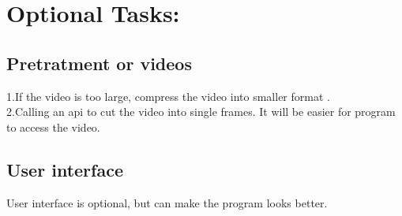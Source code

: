 \documentclass[11pt]{article} %
\begin{document}
\section{Optional Tasks:}
\subsection{Pretratment or videos}
1.If the video is too large, compress the video into smaller format .\\
2.Calling an api to cut the video into single frames. It will be easier for program to access the video.

\subsection{User interface}
User interface is optional, but can make the program looks better.
\end{document}
